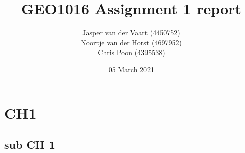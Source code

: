 \documentclass{report}
\title{GEO1016 Assignment 1 report}
\author{Jasper van der Vaart (4450752)\\Noortje van der Horst (4697952)\\Chris Poon (4395538)}
\date{05 March 2021}
\begin{document}
	
\maketitle
	
\section{CH1}

\subsection{sub CH 1}
\end{document}
